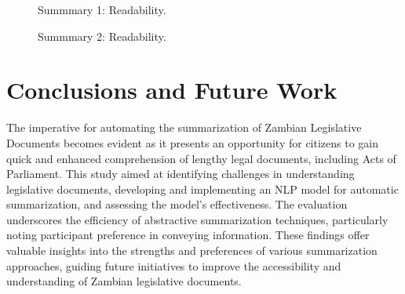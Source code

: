 \documentclass[conference]{IEEEtran}
\begin{document}
\begin{figure}%
%
\caption{Summmary 1: Readability.}
\label{fig:results_and_discussion:summarisation_models:summary1_readability}
\end{figure}


\begin{figure}%
%
\caption{Summmary 2: Readability.}
\label{fig:results_and_discussion:summarisation_models:summary2_readability}
\end{figure}

\section{Conclusions and Future Work}
\label{sec:conclusion}
The imperative for automating the summarization of Zambian Legislative Documents becomes evident as it presents an opportunity for citizens to gain quick and enhanced comprehension of lengthy legal documents, including Acts of Parliament. This study aimed at identifying challenges in understanding legislative documents, developing and implementing
an NLP model for automatic summarization, and assessing the model's effectiveness. The evaluation underscores the efficiency of abstractive summarization techniques, particularly noting participant preference in conveying information. These findings offer valuable insights into the strengths and preferences of various summarization approaches, guiding future initiatives to improve the accessibility and understanding of Zambian legislative documents.




\end{document}
